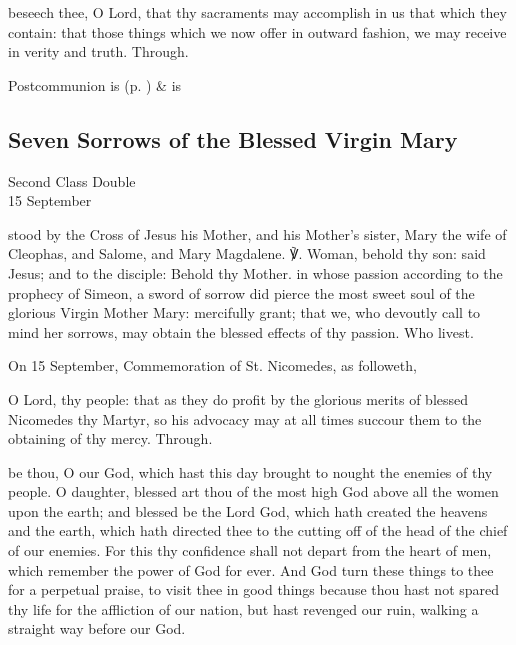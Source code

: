 \postcommunion
{} beseech thee, O Lord, that thy sacraments may accomplish in us that which they contain: that those things which we now offer in outward fashion, we may receive in verity and truth. Through.
\begin{rubric}
     Postcommunion is  (p. \pageref{SPSaints}) \&  is 
\end{rubric}


\clearpage
\subsection{Seven Sorrows of the Blessed Virgin Mary}
\begin{inhead}
    {Second Class Double\\
15 September}
\end{inhead}

\introit
{} stood by the Cross of Jesus his Mother, and his Mother's sister, Mary the wife of Cleophas, and Salome, and Mary Magdalene. ℣. Woman, behold thy son: said Jesus; and to the disciple: Behold thy Mother.
\collect
{} in whose passion according to the prophecy of Simeon, a sword of sorrow did pierce the most sweet soul of the glorious Virgin Mother Mary: mercifully grant; that we, who devoutly call to mind her sorrows, may obtain the blessed effects of thy passion. Who livest.
\begin{rubric}
	 On 15 September, Commemoration of St. Nicomedes, as followeth,
\end{rubric}
 O Lord, thy people: that as they do profit by the glorious merits of blessed Nicomedes thy Martyr, so his advocacy may at all times succour them to the obtaining of thy mercy. Through.

 be thou, O our God, which hast this day brought to nought the enemies of thy people. O daughter, blessed art thou of the most high God above all the women upon the earth; and blessed be the Lord God, which hath created the heavens and the earth, which hath directed thee to the cutting off of the head of the chief of our enemies. For this thy confidence shall not depart from the heart of men, which remember the power of God for ever. And God turn these things to thee for a perpetual praise, to visit thee in good things because thou hast not spared thy life for the affliction of our nation, but hast revenged our ruin, walking a straight way before our God.
